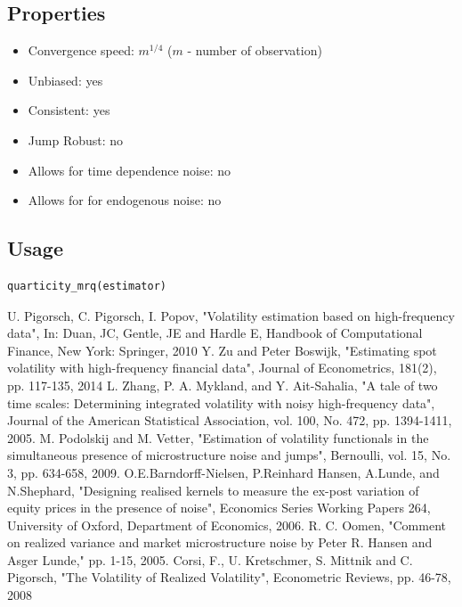 \documentclass[letterpaper]{report}
\newcounter{N}
\begin{document}
\subsection{Properties}
\begin{itemize}
\item Convergence speed: $m^{1/4}$ ($m$ - number of observation)
\item Unbiased: yes
\item Consistent: yes
\item Jump Robust: no
\item Allows for time dependence noise: no
\item Allows for for endogenous noise: no
\end{itemize}
  \subsection{Usage}
\begin{lstlisting}
quarticity_mrq(estimator)
\end{lstlisting}

\begin{thebibliography}{100}
U. Pigorsch, C. Pigorsch, I. Popov, "Volatility estimation based on high-frequency data", In: Duan, JC, Gentle, JE and Hardle E, Handbook of Computational Finance, New York: Springer, 2010
Y. Zu and Peter Boswijk, "Estimating spot volatility with high-frequency financial data", Journal of Econometrics, 181(2), pp. 117-135, 2014
L. Zhang, P. A. Mykland, and Y. Ait-Sahalia, "A tale of two time scales: Determining integrated volatility with noisy high-frequency data", Journal of the American Statistical Association, vol. 100, No. 472, pp. 1394-1411, 2005.
M. Podolskij and M. Vetter, "Estimation of volatility functionals in the simultaneous presence of microstructure noise and jumps", Bernoulli, vol. 15, No. 3, pp. 634-658, 2009.
O.E.Barndorff-Nielsen, P.Reinhard Hansen, A.Lunde, and N.Shephard, "Designing realised kernels to measure the ex-post variation of equity prices in the presence of noise", Economics Series Working Papers 264, University of Oxford, Department of Economics, 2006.
R. C. Oomen, "Comment on realized variance and market microstructure noise by Peter R. Hansen and Asger Lunde," pp. 1-15, 2005.
 Corsi, F., U. Kretschmer, S. Mittnik and C. Pigorsch, "The Volatility of Realized Volatility", Econometric Reviews, pp. 46-78, 2008
\end{thebibliography} 
 
\end{document}

